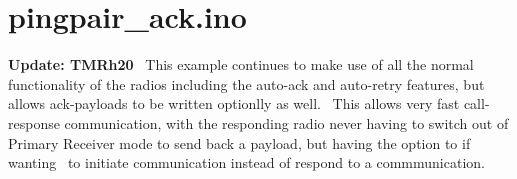\hypertarget{pingpair_ack_8ino-example}{\section{pingpair\+\_\+ack.\+ino}
}
{\bfseries Update\+: T\+M\+Rh20}~\newline
 This example continues to make use of all the normal functionality of the radios including the auto-\/ack and auto-\/retry features, but allows ack-\/payloads to be written optionlly as well.~\newline
 This allows very fast call-\/response communication, with the responding radio never having to switch out of Primary Receiver mode to send back a payload, but having the option to if wanting~\newline
 to initiate communication instead of respond to a commmunication.


\begin{DoxyCodeInclude}
\end{DoxyCodeInclude}
 